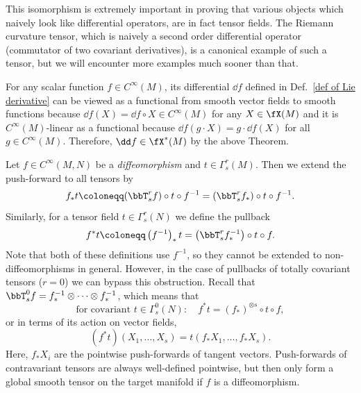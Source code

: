 \begin{rem}
    This isomorphism is extremely important in proving that various objects which naively look like differential operators, are in fact tensor fields. The Riemann curvature tensor, which is naively a second order differential operator (commutator of two covariant derivatives), is a canonical example of such a tensor, but we will encounter more examples much sooner than that.
\end{rem}


\begin{example}[$\dd f$ is a $1$-form]\label{df is a 1-form}
    For any scalar function $f\in C^\infty(M)$, its differential $\dd f$ defined in Def.\ \eqref{def of Lie derivative} can be viewed as a functional from smooth vector fields to smooth functions because $\dd f(X)=\dd f\circ X\in C^\infty(M)$ for any $X\in\fX(M)$ and it is $C^\infty(M)$-linear as a functional because $\dd f(g\cdot X)=g\cdot \dd f(X)$ for all $g\in C^\infty(M)$. Therefore, $\dd f\in \fX^\ast(M)$ by the above Theorem.
\end{example}

\begin{defn}
    Let $f\in C^\infty(M,N)$ be a \emph{diffeomorphism} and $t\in \Gamma^r_s(M)$. Then we extend the push-forward to all tensors by
    \[
    f_\ast t\coloneqq (\bbT^r_sf)\circ t\circ f^{-1}=(\bbT^r_s f_\ast)\circ t\circ f^{-1}.\label{eq pushforward formula}
    \]
    Similarly, for a tensor field $t\in \Gamma^r_s(N)$ we define the pullback
    \[
    f^\ast t\coloneqq \left(f^{-1}\right)_\ast t=\left(\bbT^r_s f^{-1}_\ast\right)\circ t\circ f.\label{eq pullback formula}
    \]
    Note that both of these definitions use $f^{-1}$, so they cannot be extended to non-diffeomorphisms in general. However, in the case of pullbacks of totally covariant tensors ($r=0$) we can bypass this obstruction. Recall that $\bbT^0_s f=f_\ast^{-1}\otimes\cdots\otimes f_\ast^{-1}$, which means that
    \[
    \text{for covariant }t\in \Gamma^0_s(N):\quad f^\ast t= (f_\ast)^{\otimes s}\circ t\circ f,
    \]
    or in terms of its action on vector fields,
    \[
    (f^\ast t)(X_1,\ldots,X_s)=t(f_\ast X_1,\ldots,f_\ast X_s).
    \]
    Here, $f_\ast X_i$ are the pointwise push-forwards of tangent vectors. Push-forwards of contravariant tensors are always well-defined pointwise, but then only form a global smooth tensor on the target manifold if $f$ is a diffeomorphism.
\end{defn}

